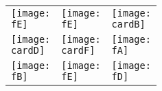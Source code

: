 \documentclass[a4paper]{article}
\newlength{\cardW}
\newlength{\cardH}
\newcommand{\cardB}{fig/detective.png}
\newcommand{\cardD}{fig/godfather.png}
\newcommand{\cardF}{fig/insane.png}
\newcommand{\fA}{fig/4lover.png}
\newcommand{\fB}{fig/4outsider.png}
\newcommand{\fD}{fig/4villager.png}
\newcommand{\fE}{fig/4villager2.png}
\begin{document}
\newpage

\begin{figure}[H]
\centering
\begin{tabular}{|>{\centering\arraybackslash}m{\cardW}|>{\centering\arraybackslash}m{\cardW}|>{\centering\arraybackslash}m{\cardW}|}
    \texttt{[image: \\fE]} &
    \texttt{[image: \\fE]} &
    \texttt{[image: \\cardB]} \\
    \texttt{[image: \\cardD]} &
    \texttt{[image: \\cardF]} &
    \texttt{[image: \\fA]} \\
    \texttt{[image: \\fB]} &
    \texttt{[image: \\fE]} &
    \texttt{[image: \\fD]} \\
\end{tabular}
\end{figure}
\end{document}
